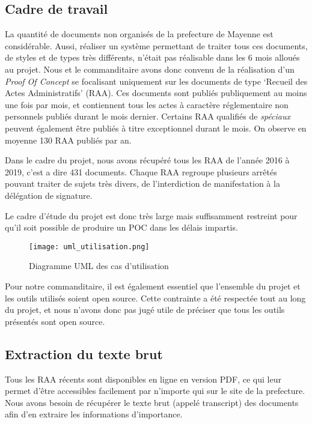 
\subsection{Cadre de travail}
La quantité de documents non organisés de la prefecture de Mayenne est considérable.
Aussi, réaliser un système permettant de traiter tous ces documents, de styles et de types très différents, n'était pas réalisable dans les 6 mois alloués au projet.
Nous et le commanditaire avons donc convenu de la réalisation d'un \textit{Proof Of Concept} se focalisant uniquement sur les documents de type `Recueil des Actes Administratifs' (RAA).
Ces documents sont publiés publiquement au moins une fois par mois, et contiennent tous les actes à caractère réglementaire non personnels publiés durant le mois dernier.
Certains RAA qualifiés de \textit{spéciaux} peuvent également être publiés à titre exceptionnel durant le mois.
On observe en moyenne 130 RAA publiés par an.

Dans le cadre du projet, nous avons récupéré tous les RAA de l'année 2016 à 2019, c'est a dire 431 documents.
Chaque RAA regroupe plusieurs arrêtés pouvant traiter de sujets très divers, de l'interdiction de manifestation à la délégation de signature.

Le cadre d'étude du projet est donc très large mais suffisamment restreint pour qu'il soit possible de produire un POC dans les délais impartis. 

\begin{figure}[h!]
  \centering
  \texttt{[image: uml\_utilisation.png]}
	\caption[]{Diagramme UML des cas d'utilisation}
	\label{fig:umlUtilisation}
\end{figure}

Pour notre commanditaire, il est également essentiel que l'ensemble du projet et les outils utilisés soient open source.
Cette contrainte a été respectée tout au long du projet, et nous n'avons donc pas jugé utile de préciser que tous les outils présentés sont open source.

\subsection{Extraction du texte brut}
Tous les RAA récents sont disponibles en ligne en version PDF, ce qui leur permet d'être accessibles facilement par n'importe qui sur le site de la prefecture.
Nous avons besoin de récupérer le texte brut (appelé transcript) des documents afin d'en extraire les informations d'importance.

